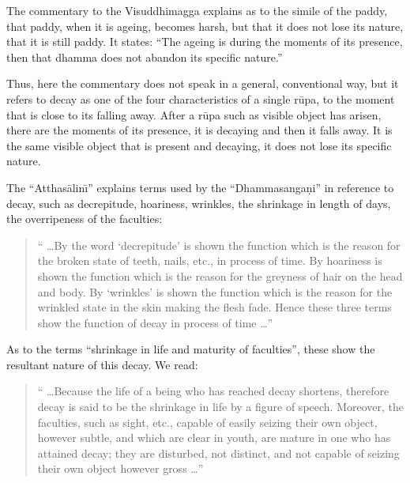 \documentclass{book}
\begin{document}
The commentary to the Visuddhimagga explains as to the simile of the
paddy, that paddy, when it is ageing, becomes harsh, but that it does
not lose its nature, that it is still paddy. It states: ``The ageing is
during the moments of its presence, then that dhamma does not abandon
its specific nature.''

Thus, here the commentary does not speak in a general, conventional way,
but it refers to decay as one of the four characteristics of a single
r\=upa, to the moment that is close to its falling away. After a r\=upa
such as visible object has arisen, there are the moments of its
presence, it is decaying and then it falls away. It is the same visible
object that is present and decaying, it does not lose its specific
nature. 




The ``Atthas{\=a}lin\=\i'' explains terms used by the ``Dhamma\-sanga\d ni''
in reference to decay, such as decrepitude, hoariness, wrinkles, the
shrinkage in length of days, the overripeness of the faculties:




\begin{quote}\begin{flushleft}
`` \ldots By the word `decrepitude' is shown the function which is the
reason for the broken state of teeth, nails, etc., in process of time.
By hoariness is shown the function which is the reason for the greyness
of hair on the head and body. By `wrinkles' is shown the function which
is the reason for the wrinkled state in the skin making the flesh fade.
Hence these three terms show the function of decay in process of
time \ldots''
\end{flushleft}\end{quote}




As to the terms ``shrinkage in life and maturity of faculties'', these
show the resultant nature of this decay. We read:




\begin{quote}\begin{flushleft}
`` \ldots Because the life of a being who has reached decay shortens,
therefore decay is said to be the shrinkage in life by a figure of
speech. Moreover, the faculties, such as sight, etc., capable of easily
seizing their own object, however subtle, and which are clear in youth,
are mature in one who has attained decay; they are disturbed, not
distinct, and not capable of seizing their own object however
gross \ldots''


\end{flushleft}\end{quote}
\end{document}
